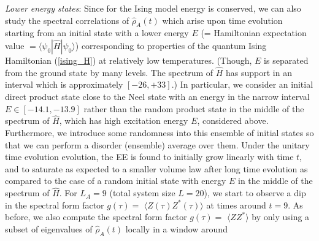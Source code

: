 \documentclass[aps,prb,preprint,onecolumn,amsmath,amssymb,superscriptaddress,eqsecnum,floatfix,scrartcl]{revtex4-1}
\begin{document}

{\it Lower energy states}:
 Since for  the 
Ising model energy is conserved,
we can also study 
the 
spectral correlations
of ${\hat \rho}_A(t)$ which arise  upon time evolution starting
 from an initial state
with  a lower energy $E$  (= Hamiltonian expectation value $=\langle \psi_0| {\hat H} | \psi_0\rangle$)
corresponding to properties of the quantum Ising Hamiltonian (\ref{ising_H}) at relatively low temperatures. (Though,
 $E$ is  separated
from the ground state by many levels. The spectrum of ${\hat H}$ has support in an interval which is approximately $[-26,+33]$.)
In particular, we
consider an initial direct  product state close to the Neel state with
an  energy  in the narrow
interval  $E\in[-14.1, -13.9]$ rather than the  random product state
in the middle of the spectrum of ${\hat H}$, which  has high excitation energy $E$, considered above. 
Furthermore, we introduce some randomness into this
ensemble of  initial states so that we can perform a 
 disorder (ensemble) average over them. Under
the unitary time evolution evolution, the EE is found to initially grow
linearly with  time $t$, and to saturate as expected
to a smaller volume law after long time evolution
as compared to the case of a random initial state with energy $E$  in the middle of the spectrum
of ${\hat H}$.
For $L_A=9$ (total system size $L=20$), 
we start to observe  a dip in
the spectral form factor $g(\tau)=$  $\langle Z(\tau)Z^*(\tau)\rangle$ at times around $t=9$.
As before, we also compute the spectral form factor $g(\tau)=$ $\langle ZZ^*\rangle$ by only using
a subset of eigenvalues of ${\hat \rho}_A(t)$ locally in a window around
\end{document}
